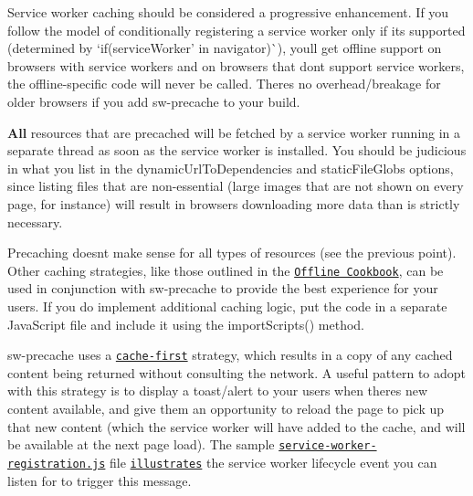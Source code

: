 \begin{DoxyItemize}
\item Service worker caching should be considered a progressive enhancement. If you follow the model of conditionally registering a service worker only if it\textquotesingle{}s supported (determined by `if(\textquotesingle{}service\+Worker' in navigator)\`{}), you\textquotesingle{}ll get offline support on browsers with service workers and on browsers that don\textquotesingle{}t support service workers, the offline-\/specific code will never be called. There\textquotesingle{}s no overhead/breakage for older browsers if you add {\ttfamily sw-\/precache} to your build.
\item {\bfseries All} resources that are precached will be fetched by a service worker running in a separate thread as soon as the service worker is installed. You should be judicious in what you list in the {\ttfamily dynamic\+Url\+To\+Dependencies} and {\ttfamily static\+File\+Globs} options, since listing files that are non-\/essential (large images that are not shown on every page, for instance) will result in browsers downloading more data than is strictly necessary.
\item Precaching doesn\textquotesingle{}t make sense for all types of resources (see the previous point). Other caching strategies, like those outlined in the \href{https://developers.google.com/web/fundamentals/instant-and-offline/offline-cookbook/}{\tt Offline Cookbook}, can be used in conjunction with {\ttfamily sw-\/precache} to provide the best experience for your users. If you do implement additional caching logic, put the code in a separate Java\+Script file and include it using the {\ttfamily import\+Scripts()} method.
\item {\ttfamily sw-\/precache} uses a \href{http://jakearchibald.com/2014/offline-cookbook/#cache-falling-back-to-network}{\tt cache-\/first} strategy, which results in a copy of any cached content being returned without consulting the network. A useful pattern to adopt with this strategy is to display a toast/alert to your users when there\textquotesingle{}s new content available, and give them an opportunity to reload the page to pick up that new content (which the service worker will have added to the cache, and will be available at the next page load). The sample \href{/demo/app/js/service-worker-registration.js}{\tt {\ttfamily service-\/worker-\/registration.\+js}} file \href{https://github.com/GoogleChrome/sw-precache/blob/7688ee8ccdaddd9171af352384d04d16d712f9d3/demo/app/js/service-worker-registration.js#L51}{\tt illustrates} the service worker lifecycle event you can listen for to trigger this message.
\end{DoxyItemize}

